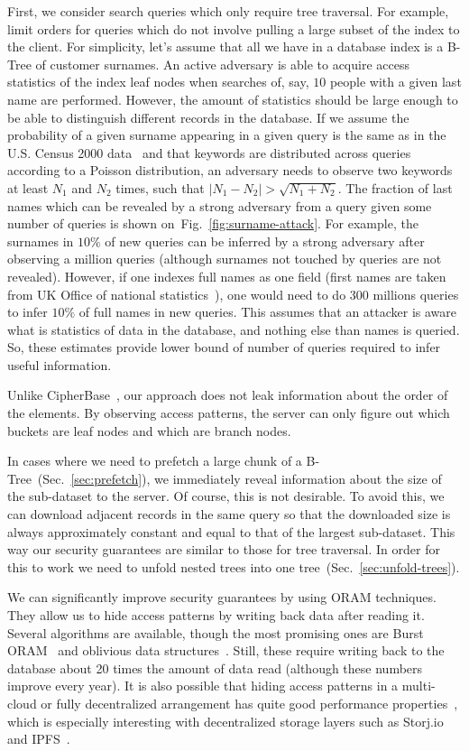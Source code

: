 \documentclass[notitlepage,longbibliography]{revtex4-1}
\newcommand{\figref}[1]{Fig.~\ref{#1}}
\begin{document}
First, we consider search queries which only require tree traversal.
For example, limit orders for queries which do not involve pulling a large subset of the index to the client.
For simplicity, let's assume that all we have in a database index is a B-Tree of customer surnames.
An active adversary is able to acquire access statistics of the index leaf nodes when searches of, say, $10$ people with a given last name are performed.
However, the amount of statistics should be large enough to be able to distinguish different records in the database.
If we assume the probability of a given surname appearing in a given query is the same as in the U.S. Census 2000 data~\cite{us-census-surnames}
and that keywords are distributed across queries according to a Poisson distribution,
an adversary needs to observe two keywords at least $N_1$ and $N_2$ times, such that $|N_1 - N_2| > \sqrt{N_1 + N_2}$.
The fraction of last names which can be revealed by a strong adversary from a query given some number of queries is shown on~\figref{fig:surname-attack}.
For example, the surnames in $10\%$ of new queries can be inferred by a strong adversary after observing a million queries (although surnames not touched by queries are not revealed).
However, if one indexes full names as one field (first names are taken from UK Office of national statistics~\cite{uk-first-names}),
one would need to do $300$ millions queries to infer $10\%$ of full names in new queries.
This assumes that an attacker is aware what is statistics of data in the database, and nothing else than names is queried.
So, these estimates provide lower bound of number of queries required to infer useful information.

Unlike CipherBase~\cite{cipherbase}, our approach does not leak information about the order of the elements.
By observing access patterns, the server can only figure out which buckets are leaf nodes and which are branch nodes.

In cases where we need to prefetch a large chunk of a B-Tree~(Sec.~\ref{sec:prefetch}), we immediately reveal information about the size of the sub-dataset to the server.
Of course, this is not desirable.
To avoid this, we can download adjacent records in the same query so that the downloaded size is always approximately constant and equal to that of the largest sub-dataset.
This way our security guarantees are similar to those for tree traversal.
In order for this to work we need to unfold nested trees into one tree~(Sec.~\ref{sec:unfold-trees}).

We can significantly improve security guarantees by using ORAM techniques.
They allow us to hide access patterns by writing back data after reading it.
Several algorithms are available, though the most promising ones are Burst ORAM~\cite{burst-oram}
and oblivious data structures~\cite{ods-wang-2014}.
Still, these require writing back to the database about 20 times the amount of data read
(although these numbers improve every year).
It is also possible that hiding access patterns in a multi-cloud or fully decentralized arrangement has quite good performance properties~\cite{oram-multicloud},
which is especially interesting with decentralized storage layers such as Storj.io~\cite{storj} and IPFS~\cite{ipfs}.
\end{document}
